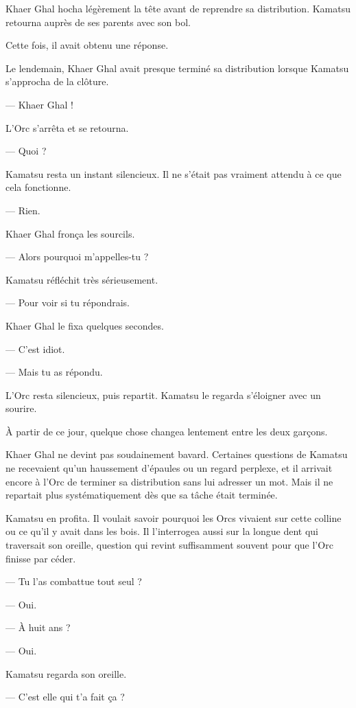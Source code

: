 Khaer Ghal hocha légèrement la tête avant de reprendre sa distribution.
Kamatsu retourna auprès de ses parents avec son bol.

Cette fois, il avait obtenu une réponse.

\scenebreak

Le lendemain, Khaer Ghal avait presque terminé sa distribution lorsque Kamatsu
s'approcha de la clôture.

— Khaer Ghal !

L'Orc s'arrêta et se retourna.

— Quoi ?

Kamatsu resta un instant silencieux. Il ne s'était pas vraiment attendu à ce
que cela fonctionne.

— Rien.

Khaer Ghal fronça les sourcils.

— Alors pourquoi m'appelles-tu ?

Kamatsu réfléchit très sérieusement.

— Pour voir si tu répondrais.

Khaer Ghal le fixa quelques secondes.

— C'est idiot.

— Mais tu as répondu.

L'Orc resta silencieux, puis repartit. Kamatsu le regarda s'éloigner avec un
sourire.

\scenebreak

À partir de ce jour, quelque chose changea lentement entre les deux garçons.

Khaer Ghal ne devint pas soudainement bavard. Certaines questions de Kamatsu
ne recevaient qu'un haussement d'épaules ou un regard perplexe, et il arrivait
encore à l'Orc de terminer sa distribution sans lui adresser un mot. Mais il ne
repartait plus systématiquement dès que sa tâche était terminée.

Kamatsu en profita. Il voulait savoir pourquoi les Orcs vivaient sur cette
colline ou ce qu'il y avait dans les bois. Il l'interrogea aussi sur la longue
dent qui traversait son oreille, question qui revint suffisamment souvent pour
que l'Orc finisse par céder.

— Tu l'as combattue tout seul ?

— Oui.

— À huit ans ?

— Oui.

Kamatsu regarda son oreille.

— C'est elle qui t'a fait ça ?


